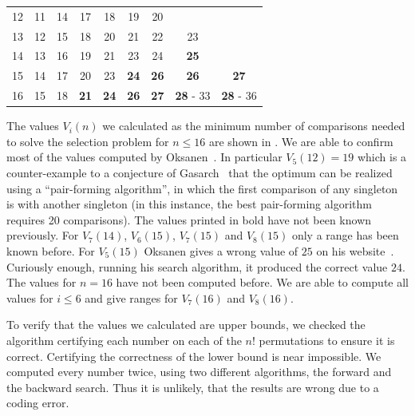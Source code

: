 \documentclass[twoside,leqno,twocolumn]{article}
\begin{document}
\begin{table}[!t]
\begin{tabular}{c|cccccccc}
    12  & 11                      & 14 & 17          & 18          & 19          & 20                                                \\
    13  & 12                      & 15 & 18          & 20          & 21          & 22          & 23                                  \\
    14  & 13                      & 16 & 19          & 21          & 23          & 24          & \textbf{25}                         \\
    15  & 14                      & 17 & 20          & 23          & \textbf{24} & \textbf{26} & \textbf{26}      & \textbf{27}      \\
    16  & 15                      & 18 & \textbf{21} & \textbf{24} & \textbf{26} & \textbf{27} & \textbf{28} - 33 & \textbf{28} - 36 \\
  \end{tabular}
\end{table}

The values $V_i(n)$ we calculated as the minimum number of comparisons needed to solve the selection problem for $n \leq 16$ are shown in .
We are able to confirm most of the values computed by Oksanen~\cite{Oksanen}.
In particular $V_5(12) = 19$ which is a counter-example to a conjecture of Gasarch~\cite{Gasarch1996} that the optimum can be realized using a ``pair-forming algorithm'', in which the first comparison of any singleton is with another singleton (in this instance, the best pair-forming algorithm requires 20 comparisons).
The values printed in bold have not been known previously.
For $V_7(14)$, $V_6(15)$, $V_7(15)$ and $V_8(15)$ only a range has been known before.
For $V_5(15)$ Oksanen gives a wrong value of $25$ on his website~\cite{Oksanen}.
Curiously enough, running his search algorithm, it produced the correct value $24$.
The values for $n=16$ have not been computed before.
We are able to compute all values for $i \le 6$ and give ranges for $V_7(16)$ and $V_8(16)$.

To verify that the values we calculated are upper bounds, we checked the algorithm certifying each number on each of the $n!$ permutations to ensure it is correct.
Certifying the correctness of the lower bound is near impossible.
We computed every number twice, using two different algorithms, the forward and the backward search.
Thus it is unlikely, that the results are wrong due to a coding error.
\end{document}
